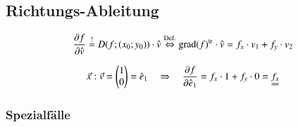 

\subsection{Richtungs-Ableitung}
\[
    \frac{\partial f}{\partial\hat{v}}\overset{!}=D(f;(x_{0};y_{0}))\cdot\hat{v}\overset{\text{Def.}}\Leftrightarrow \operatorname{grad}(f)^{\operatorname{tr}}\cdot\hat{v}=f_{x}\cdot v_{1}+f_{y}\cdot v_{2}
\]


\[
    \vec{x} : \vec{v} = 
\begin{pmatrix}
    1\\
    0
\end{pmatrix}
= \hat{e}_1
\quad\Rightarrow\quad
    \frac{\partial f}{\partial\hat{e}_{1}}=f_{x}\cdot1+f_{y}\cdot0=\uuline{f_{x}\strut}
\]


\subsubsection{Spezialfälle}


